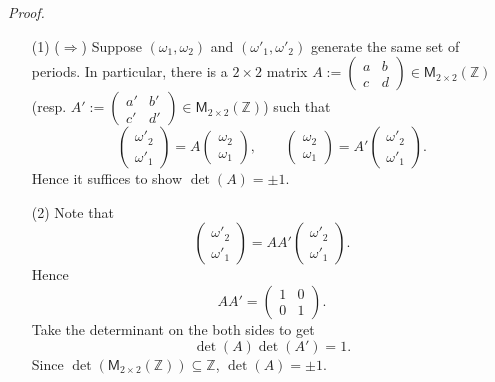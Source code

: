 \documentclass{article}
\begin{document}
\emph{Proof.}
\begin{enumerate}
\item[(1)]
  ($\Longrightarrow$)
  Suppose $(\omega_1,\omega_2)$ and $(\omega'_1,\omega'_2)$
  generate the same set of periods.
  In particular,
  there is a $2 \times 2$ matrix
  $A := \begin{pmatrix}
    a & b \\
    c & d
  \end{pmatrix} \in \mathsf{M}_{2 \times 2}(\mathbb{Z})$
  (resp.
  $A' := \begin{pmatrix}
    a' & b' \\
    c' & d'
  \end{pmatrix} \in \mathsf{M}_{2 \times 2}(\mathbb{Z})$)
  such that
  \[
    \begin{pmatrix}
      \omega'_2 \\
      \omega'_1
    \end{pmatrix}
    =
    A
    \begin{pmatrix}
      \omega_2 \\
      \omega_1
    \end{pmatrix}, \qquad
    \begin{pmatrix}
      \omega_2 \\
      \omega_1
    \end{pmatrix}
    =
    A'
    \begin{pmatrix}
      \omega'_2 \\
      \omega'_1
    \end{pmatrix}.
  \]
  Hence it suffices to show $\det(A) = \pm 1$.

\item[(2)]
  Note that
  \[
    \begin{pmatrix}
      \omega'_2 \\
      \omega'_1
    \end{pmatrix}
    =
    A A'
    \begin{pmatrix}
      \omega'_2 \\
      \omega'_1
    \end{pmatrix}.
  \]
  Hence
  \[
    A A'
    =
    \begin{pmatrix}
      1 & 0 \\
      0 & 1
    \end{pmatrix}.
  \]
  Take the determinant on the both sides to get
  \[
    \det(A) \det(A') = 1.
  \]
  Since $\det(\mathsf{M}_{2 \times 2}(\mathbb{Z})) \subseteq \mathbb{Z}$,
  $\det(A) = \pm 1$.


\end{enumerate}
\end{document}
